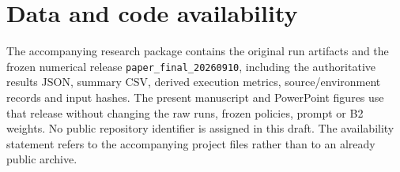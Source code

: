 \documentclass[]{interact}
\theoremstyle{plain}
\theoremstyle{definition}
\theoremstyle{remark}
\begin{document}
\section*{Data and code availability}

The accompanying research package contains the original run artifacts and the frozen numerical release \nolinkurl{paper_final_20260910}, including the authoritative results JSON, summary CSV, derived execution metrics, source/environment records and input hashes. The present manuscript and PowerPoint figures use that release without changing the raw runs, frozen policies, prompt or B2 weights. No public repository identifier is assigned in this draft. The availability statement refers to the accompanying project files rather than to an already public archive.

\FloatBarrier


\end{document}
